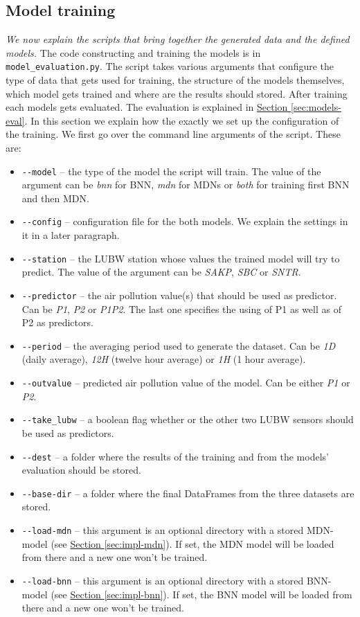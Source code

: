 \documentclass[12pt,a4paper,twoside]{scrartcl}
\numberwithin{equation}{section}
\newcommand{\refsec}[1]{\hyperref[#1]{Section \ref*{#1}}}
\begin{document}
\subsection{Model training}\label{sec:models-train}
\emph{We now explain the scripts that bring together the generated data and the defined models.}
The code constructing and training the models is in \texttt{model\_evaluation.py}. The script takes various arguments that configure the type of data that gets used for training, the structure of the models themselves, which model gets trained and where are the results should stored. After training each models gets evaluated. The evaluation is explained in \refsec{sec:models-eval}. In this section we explain how the exactly we set up the configuration of the training. We first go over the command line arguments of the script. These are:
\begin{itemize}
\item \texttt{-{}-model} -- the type of the model the script will train. The value of the argument can be \emph{bnn} for BNN, \emph{mdn} for MDNs or \emph{both} for training first BNN and then MDN.\@
\item \texttt{-{}-config} -- configuration file for the both models. We explain the settings in it in a later paragraph.\@
\item \texttt{-{}-station} -- the LUBW station whose values the trained model will try to predict. The value of the argument can be \emph{SAKP}, \emph{SBC} or \emph{SNTR}.\@
\item \texttt{-{}-predictor} -- the air pollution value(s) that should be used as predictor. Can be \emph{P1}, \emph{P2} or \emph{P1P2}. The last one specifies the using of P1 as well as of P2 as predictors.\@
\item \texttt{-{}-period} -- the averaging period used to generate the dataset. Can be \emph{1D} (daily average), \emph{12H} (twelve hour average) or \emph{1H} (1 hour average).\@
\item \texttt{-{}-outvalue} -- predicted air pollution value of the model. Can be either \emph{P1} or \emph{P2}.\@
\item \texttt{-{}-take\_lubw} -- a boolean flag whether or the other two LUBW sensors should be used as predictors.\@
\item \texttt{-{}-dest} -- a folder where the results of the training and from the models' evaluation should be stored.\@
\item \texttt{-{}-base-dir} -- a folder where the final DataFrames from the three datasets are stored.\@
\item \texttt{-{}-load-mdn} -- this argument is an optional directory with a stored MDN-model (see \refsec{sec:impl-mdn}). If set, the MDN model will be loaded from there and a new one won't be trained.\@
\item \texttt{-{}-load-bnn} -- this argument is an optional directory with a stored BNN-model (see \refsec{sec:impl-bnn}). If set, the BNN model will be loaded from there and a new one won't be trained.\@
\end{itemize}
\end{document}

